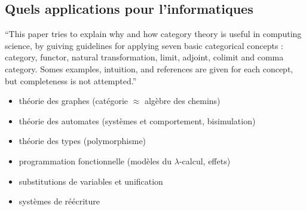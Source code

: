 \subsection{Quels applications pour l'informatiques}
“This paper tries to explain why and how category theory is useful in
computing science, by guiving guidelines for applying seven basic categorical
concepts : category, functor, natural transformation, limit, adjoint, colimit and
comma category. Somes examples, intuition, and references are given for
each concept, but completeness is not attempted.”
\begin{itemize}
  \item théorie des graphes (catégorie $\approx$ algèbre des chemins)
  \item théorie des automates (systèmes et comportement, bisimulation)
  \item théorie des types (polymorphisme)
  \item programmation fonctionnelle (modèles du $\lambda$-calcul, effets)
 \item substitutions de variables et unification
  \item systèmes de réécriture
\end{itemize}

